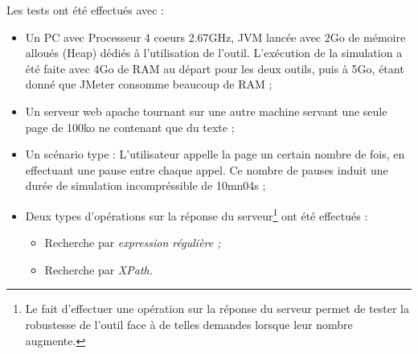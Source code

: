 Les tests ont été effectués avec :
\begin{itemize}
  \item Un PC avec Processeur 4 coeurs 2.67GHz, JVM lancée avec 2Go de mémoire alloués (Heap) dédiés à l'utilisation de l'outil. L'exécution de la simulation a été faite avec 4Go de RAM au départ pour les deux outils, puis à 5Go, étant donné que JMeter consomme beaucoup de RAM ;
  \item Un serveur web apache tournant sur une autre machine servant une seule page de 100ko ne contenant que du texte ;
  \item Un scénario type : L'utilisateur appelle la page un certain nombre de fois, en effectuant une pause entre chaque appel. Ce nombre de pauses induit une durée de simulation incompréssible de 10mn04s ;
  \item Deux types d'opérations sur la réponse du serveur\footnote{Le fait d'effectuer une opération sur la réponse du serveur permet de tester la robustesse de l'outil face à de telles demandes lorsque leur nombre augmente.} ont été effectués :
  \begin{itemize}
    \item Recherche par \em{expression régulière} ;
    \item Recherche par \em{XPath}.
  \end{itemize}
\end{itemize}

